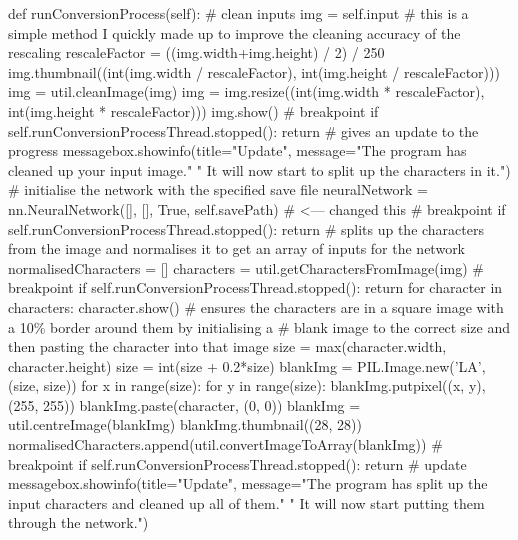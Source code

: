 \documentclass{report}
\begin{document}
\begin{python}
    def runConversionProcess(self):
        # clean inputs
        img = self.input
        # this is a simple method I quickly made up to improve the cleaning accuracy of the rescaling
        rescaleFactor = ((img.width+img.height) / 2) / 250
        img.thumbnail((int(img.width / rescaleFactor), int(img.height / rescaleFactor)))
        img = util.cleanImage(img)
        img = img.resize((int(img.width * rescaleFactor), int(img.height * rescaleFactor)))
        img.show()
        # breakpoint
        if self.runConversionProcessThread.stopped():
            return
        # gives an update to the progress
        messagebox.showinfo(title="Update",
                            message="The program has cleaned up your input image."
                            " It will now start to split up the characters in it.")
        # initialise the network with the specified save file
        neuralNetwork = nn.NeuralNetwork([], [], True, self.savePath)  # <--- changed this
        # breakpoint
        if self.runConversionProcessThread.stopped():
            return
        # splits up the characters from the image and normalises it to get an array of inputs for the network
        normalisedCharacters = []
        characters = util.getCharactersFromImage(img)
        # breakpoint
        if self.runConversionProcessThread.stopped():
            return
        for character in characters:
            character.show()
            # ensures the characters are in a square image with a 10\% border around them by initialising a
            # blank image to the correct size and then pasting the character into that image
            size = max(character.width, character.height)
            size = int(size + 0.2*size)
            blankImg = PIL.Image.new('LA', (size, size))
            for x in range(size):
                for y in range(size):
                    blankImg.putpixel((x, y), (255, 255))
            blankImg.paste(character, (0, 0))
            blankImg = util.centreImage(blankImg)
            blankImg.thumbnail((28, 28))
            normalisedCharacters.append(util.convertImageToArray(blankImg))
            # breakpoint
            if self.runConversionProcessThread.stopped():
                return
        # update
        messagebox.showinfo(title="Update",
                            message="The program has split up the input
                            characters and cleaned up all of them."
                            " It will now start putting them through the network.")


\end{python}
\end{document}
